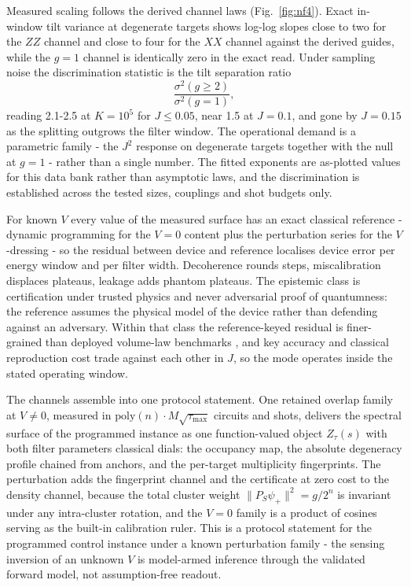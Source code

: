 Measured scaling follows the derived channel laws (Fig.~\ref{fig:nf4}). Exact in-window tilt variance at degenerate targets shows log-log slopes close to two for the $ZZ$ channel and close to four for the $XX$ channel against the derived guides, while the $g = 1$ channel is identically zero in the exact read. Under sampling noise the discrimination statistic is the tilt separation ratio
\begin{equation}\label{def:tilt-separation-ratio}
\frac{\sigma^2(g \ge 2)}{\sigma^2(g = 1)},
\end{equation}
reading 2.1-2.5 at $K = 10^5$ for $J \le 0.05$, near 1.5 at $J = 0.1$, and gone by $J = 0.15$ as the splitting outgrows the filter window. The operational demand is a parametric family - the $J^2$ response on degenerate targets together with the null at $g = 1$ - rather than a single number. The fitted exponents are as-plotted values for this data bank rather than asymptotic laws, and the discrimination is established across the tested sizes, couplings and shot budgets only.

For known $V$ every value of the measured surface has an exact classical reference - dynamic programming for the $V = 0$ content plus the perturbation series for the $V$-dressing - so the residual between device and reference localises device error per energy window and per filter width. Decoherence rounds steps, miscalibration displaces plateaus, leakage adds phantom plateaus. The epistemic class is certification under trusted physics and never adversarial proof of quantumness: the reference assumes the physical model of the device rather than defending against an adversary. Within that class the reference-keyed residual is finer-grained than deployed volume-law benchmarks \cite{boixo2018xeb}, and key accuracy and classical reproduction cost trade against each other in $J$, so the mode operates inside the stated operating window.

The channels assemble into one protocol statement. One retained overlap family at $V \neq 0$, measured in $\mathrm{poly}(n) \cdot M\sqrt{\tau_{\max}}$ circuits and shots, delivers the spectral surface of the programmed instance as one function-valued object $Z_\tau(s)$ with both filter parameters classical dials: the occupancy map, the absolute degeneracy profile chained from anchors, and the per-target multiplicity fingerprints. The perturbation adds the fingerprint channel and the certificate at zero cost to the density channel, because the total cluster weight $\|P_S \psi_+\|^2 = g/2^n$ is invariant under any intra-cluster rotation, and the $V = 0$ family is a product of cosines serving as the built-in calibration ruler. This is a protocol statement for the programmed control instance under a known perturbation family - the sensing inversion of an unknown $V$ is model-armed inference through the validated forward model, not assumption-free readout.

